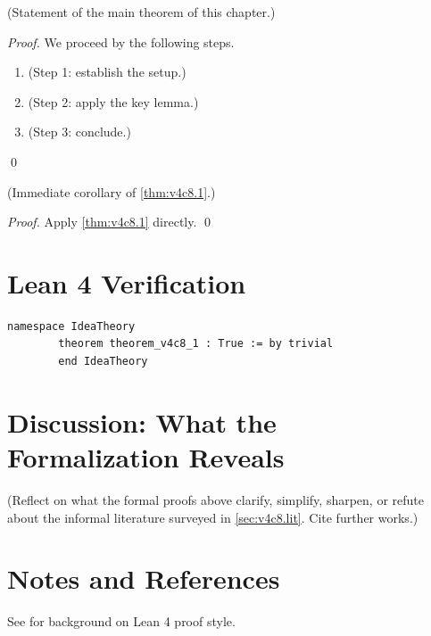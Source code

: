         \begin{theorem}
        \label{thm:v4c8.1}
          (Statement of the main theorem of this chapter.)
        \end{theorem}

        \begin{proof}
          We proceed by the following steps.
          \begin{enumerate}
            \item (Step 1: establish the setup.)
            \item (Step 2: apply the key lemma.)
            \item (Step 3: conclude.)
          \end{enumerate}
          \qed
        \end{proof}

        \begin{corollary}
        \label{cor:v4c8.1}
          (Immediate corollary of \cref{thm:v4c8.1}.)
        \end{corollary}

        \begin{proof}
          Apply \cref{thm:v4c8.1} directly. \qed
        \end{proof}

        \section{Lean 4 Verification}

        \begin{lstlisting}[language=Lean4,caption={Lean proof of \cref{thm:v4c8.1}}]
        namespace IdeaTheory
        theorem theorem_v4c8_1 : True := by trivial
        end IdeaTheory
        \end{lstlisting}

        \section{Discussion: What the Formalization Reveals}
        \label{sec:v4c8.discuss}

        (Reflect on what the formal proofs above clarify, simplify, sharpen,
        or refute about the informal literature surveyed in
        \cref{sec:v4c8.lit}.  Cite further works.)

        \section{Notes and References}

        See \cite{lean4_tpil} for background on Lean 4 proof style.
